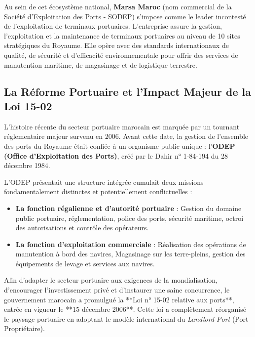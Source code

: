 \documentclass[12pt,a4paper,oneside]{report}
\begin{document}
Au sein de cet écosystème national, \textbf{Marsa Maroc} (nom commercial de la Société d'Exploitation des Ports - SODEP) s'impose comme le leader incontesté de l'exploitation de terminaux portuaires. L'entreprise assure la gestion, l'exploitation et la maintenance de terminaux portuaires au niveau de 10 sites stratégiques du Royaume. Elle opère avec des standards internationaux de qualité, de sécurité et d'efficacité environnementale pour offrir des services de manutention maritime, de magasinage et de logistique terrestre.

\subsection{La Réforme Portuaire et l'Impact Majeur de la Loi 15-02}
L'histoire récente du secteur portuaire marocain est marquée par un tournant réglementaire majeur survenu en 2006. Avant cette date, la gestion de l'ensemble des ports du Royaume était confiée à un organisme public unique : l'\textbf{ODEP (Office d'Exploitation des Ports)}, créé par le Dahir n° 1-84-194 du 28 décembre 1984.

L'ODEP présentait une structure intégrée cumulait deux missions fondamentalement distinctes et potentiellement conflictuelles :
\begin{itemize}
    \item \textbf{La fonction régalienne et d'autorité portuaire} : Gestion du domaine public portuaire, réglementation, police des ports, sécurité maritime, octroi des autorisations et contrôle des opérateurs.
    \item \textbf{La fonction d'exploitation commerciale} : Réalisation des opérations de manutention à bord des navires, Magasinage sur les terre-pleins, gestion des équipements de levage et services aux navires.
\end{itemize}

Afin d'adapter le secteur portuaire aux exigences de la mondialisation, d'encourager l'investissement privé et d'instaurer une saine concurrence, le gouvernement marocain a promulgué la **Loi n° 15-02 relative aux ports**, entrée en vigueur le **15 décembre 2006**. Cette loi a complètement réorganisé le paysage portuaire en adoptant le modèle international du \textit{Landlord Port} (Port Propriétaire). 
\end{document}
